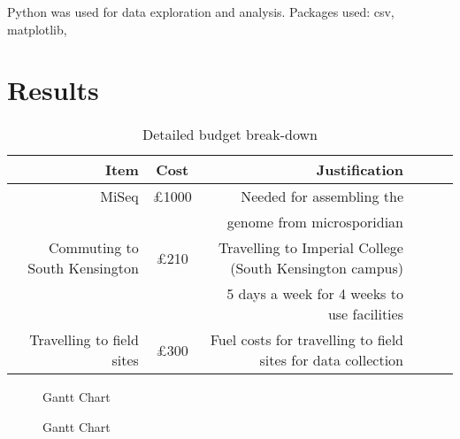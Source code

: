 \documentclass[11pt]{article}
\newcommand{\ra}[1]{\renewcommand{\arraystretch}{#1}}
\begin{document}
	Python was used for data exploration and analysis. Packages used: csv, matplotlib, 
	
	\section{Results}
	
	\begin{table*}[h]\centering
		\ra{1.3}
		\begin{tabular} {@{}rcrcrc@{}}\toprule
			\hline
			\textbf{Item} & \textbf{Cost} & \textbf{Justification} \\
			\hline\hline
			MiSeq & \pounds1000 & Needed for assembling the \\
			& & genome from microsporidian \\
			\hline
			Commuting to South Kensington & \pounds210 &	Travelling to Imperial College (South Kensington campus) \\
			& & 5 days a week for 4 weeks to use facilities \\
			\hline
			Travelling to field sites & \pounds300 & Fuel costs for travelling to field sites for data collection\\
			\hline
			\bottomrule
		\end{tabular}
		\caption{Detailed budget break-down}
	\end{table*}
	
	\newpage
	\begin{figure}[h!]
		
		
		\caption{	Gantt Chart}
		\label{MRes Gantt}
		
	\end{figure} 
	
	\newpage
	
	\begin{figure}[h!]
	
	
	\caption{	Gantt Chart}
	\label{MRes Gantt}
	
	\end{figure} 

	\newpage
	\begin{thebibliography}{1}
	
	\end{thebibliography}
	
\end{document}

